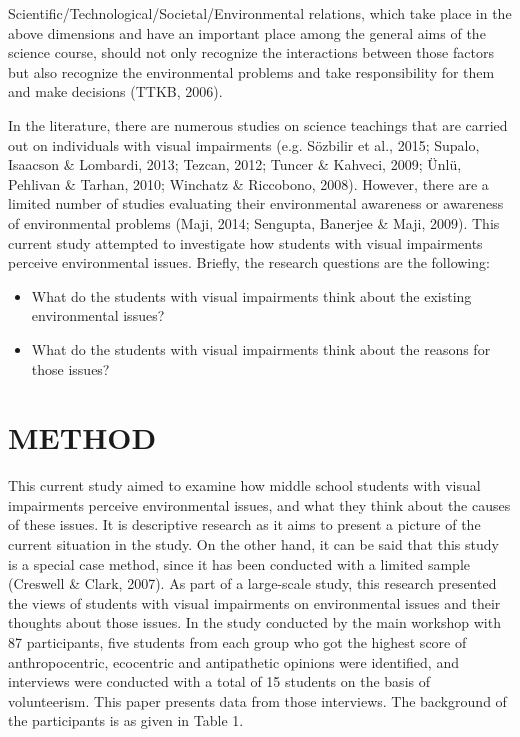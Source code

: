 \documentclass[11.5pt]{sig-alternate} %
\begin{document}
\begin{large}
Scientific/Technological/Societal/Environmental relations, which take place in the above dimensions and have an important place among the general aims of the science course, should not only recognize the interactions between those factors but also recognize the environmental problems and take responsibility for them and make decisions (TTKB, 2006).

In the literature, there are numerous studies on science teachings that are carried out on individuals with visual impairments (e.g. Sözbilir et al., 2015; Supalo, Isaacson \& Lombardi, 2013; Tezcan, 2012; Tuncer \& Kahveci, 2009; Ünlü, Pehlivan \& Tarhan, 2010; Winchatz \& Riccobono, 2008). However, there are a limited number of studies evaluating their environmental awareness or awareness of environmental problems (Maji, 2014; Sengupta, Banerjee \& Maji, 2009). This current study attempted to investigate how students with visual impairments perceive environmental issues. Briefly, the research questions are the following:

\begin{itemize}
    \item What do the students with visual impairments think about the existing environmental issues?
    \item What do the students with visual impairments think about the reasons for those issues?
\end{itemize}

\section*{METHOD}
This current study aimed to examine how middle school students with visual impairments perceive environmental issues, and what they think about the causes of these issues. It is  descriptive research as it aims to present a picture of the current situation in the study. On the other hand, it can be said that this study is a special case method, since it has been conducted with a limited sample (Creswell \& Clark, 2007). As part of a large-scale study, this research presented the views of students with visual impairments on environmental issues and their thoughts about those issues. In the study conducted by the main workshop with 87 participants, five students from each group who got the highest score of anthropocentric, ecocentric and antipathetic opinions were identified, and interviews were conducted with a total of 15 students on the basis of volunteerism. This paper presents data from those interviews. The background of the participants is as given in Table 1.


\end{large}
\end{document}
